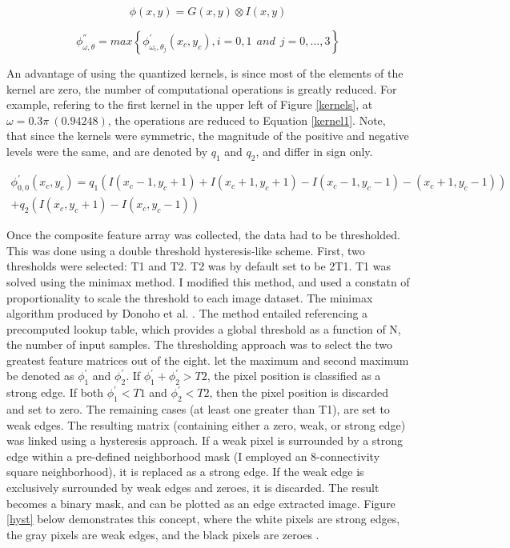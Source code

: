 \documentclass[./rarnold_final_project.tex]{subfiles}
\begin{document}
\begin{equation}
\label{phi}
\phi(x,y) = G(x,y) \otimes I(x,y)
\end{equation}

\begin{equation}
\label{phi_max}
\phi^{''}_{\omega , \theta} = max \left\lbrace \phi^{'}_{\omega_i, \theta_j}(x_c, y_c), i=0,1 \:\: and \:\: j=0,...,3 \right\rbrace
\end{equation}

\noindent An advantage of using the quantized kernels, is since most of the elements of the kernel are zero, the number of computational operations is greatly reduced.  For example, refering to the first kernel in the upper left of Figure \ref{kernels}, at $\omega=0.3\pi \: (0.94248)$, the operations are reduced to Equation \eqref{kernel1}.  Note, that since the kernels were symmetric, the magnitude of the positive and negative levels were the same, and are denoted by $q_1$ and $q_2$, and differ in sign only.  

\begin{multline}
\label{kernel1}
\phi^{'}_{0,0}(x_c, y_c) = q_1(I(x_c - 1, y_c + 1) + I(x_c + 1, y_c + 1) - I(x_c - 1, y_c - 1) - (x_c + 1, y_c - 1)) \\
 + q_2( I(x_c,y_c+1) - I(x_c, y_c-1))
\end{multline}

\noindent Once the composite feature array was collected, the data had to be thresholded.  This was done using a double threshold hysteresis-like scheme.  First, two thresholds were selected: T1 and T2.  T2 was by default set to be 2T1.  T1 was solved using the minimax method.  I modified this method, and used a constatn of proportionality to scale the threshold to each image dataset.  The minimax algorithm produced by Donoho et al. \cite{ref15}.  The method entailed referencing a precomputed lookup table, which provides a global threshold as a function of N, the number of input samples.  The thresholding approach was to select the two greatest feature matrices out of the eight.  let the maximum and second maximum be denoted as $\phi^{'}_1$ and $\phi^{'}_2$.  If $\phi^{'}_1 + \phi^{'}_2 > T2$, the pixel position is classified as a strong edge.  If both $\phi^{'}_1 < T1$ and $\phi^{'}_2 < T2$, then the pixel position is discarded and set to zero.  The remaining cases (at least one greater than T1), are set to weak edges.  The resulting matrix (containing either a zero, weak, or strong edge) was linked using a hysteresis approach.  If a weak pixel is surrounded by a strong edge within a pre-defined neighborhood mask (I employed an 8-connectivity square neighborhood), it is replaced as a strong edge.  If the weak edge is exclusively surrounded by weak edges and zeroes,  it is discarded.  The result becomes a binary mask, and can be plotted as an edge extracted image.  Figure \ref{hyst} below demonstrates this concept, where the white pixels are strong edges, the gray pixels are weak edges, and the black pixels are zeroes \cite{website}.
\end{document}
